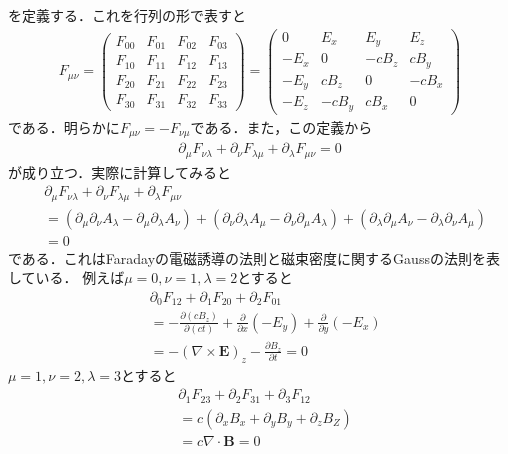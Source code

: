 \documentclass{report}
\begin{document}
  を定義する．これを行列の形で表すと
  \begin{align}
    F_{\mu\nu}=
    \begin{pmatrix}
      F_{00} & F_{01} & F_{02} & F_{03}\\
      F_{10} & F_{11} & F_{12} & F_{13}\\
      F_{20} & F_{21} & F_{22} & F_{23}\\
      F_{30} & F_{31} & F_{32} & F_{33}
    \end{pmatrix}
    =
    \begin{pmatrix}
      0 & E_x & E_y & E_z \\
      -E_x & 0 & -cB_z & cB_y\\
      -E_y & cB_z & 0 & -cB_x\\
      -E_z& -cB_y & cB_x & 0
    \end{pmatrix}
  \end{align}
  である．明らかに$F_{\mu\nu} = -F_{\nu\mu}$である．また，この定義から
  \begin{align}
    \partial_\mu F_{\nu\lambda} + \partial_\nu F_{\lambda\mu} + \partial_\lambda F_{\mu\nu} = 0
  \end{align}
  が成り立つ．実際に計算してみると
  \begin{align}
    &\partial_\mu F_{\nu\lambda} + \partial_\nu F_{\lambda\mu} + \partial_\lambda F_{\mu\nu} \\
    &= (\partial_\mu\partial_\nu A_\lambda - \partial_\mu\partial_\lambda A_\nu) + (\partial_\nu\partial_\lambda A_\mu - \partial_\nu\partial_\mu A_\lambda)
    + (\partial_\lambda\partial_\mu A_\nu - \partial_\lambda\partial_\nu A_\mu)\\
    &= 0
  \end{align}
  である．これはFaradayの電磁誘導の法則と磁束密度に関するGaussの法則を表している．
  例えば$\mu = 0,\nu = 1, \lambda =2$とすると
  \begin{align}
    &\partial_0 F_{12} + \partial_1 F_{20} + \partial_2 F_{01}\\
    &= -\frac{\partial (cB_z)}{\partial (ct)} + \frac{\partial}{\partial x}(-E_y) + \frac{\partial}{\partial y}(-E_x)\\
    &= -(\nabla\times \bm{E})_z - \frac{\partial B_z}{\partial t} = 0
  \end{align}
  $\mu=1,\nu=2,\lambda=3$とすると
  \begin{align}
    &\partial_1 F_{23} + \partial_2 F_{31} + \partial_3 F_{12}\\
    &= c(\partial_xB_x + \partial_yB_y + \partial_zB_Z)\\
    &= c\nabla\cdot\bm{B} = 0
  \end{align}
\end{document}
